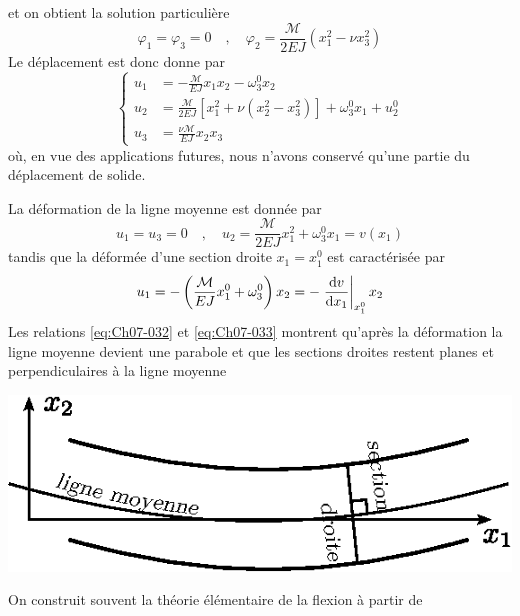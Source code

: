 et on obtient la solution particulière 
\begin{equation}
    \varphi_1 = \varphi_3 = 0 \quad , \quad \varphi_2 = \frac{\mathcal{M}}{2EJ} \left( x_1^2 - \nu x_3^2 \right)
    \label{eq:Ch07-030}
\end{equation}
Le déplacement est donc donne par
\begin{equation}
    \left\{
    \begin{aligned}
        u_1 & = -\frac{\mathcal{M}}{EJ} x_1x_2 -\omega_3^0x_2 \\
        u_2 & = \frac{\mathcal{M}}{2EJ} \left[ x_1^2 + \nu \left( x_2^2 - x_3^2 \right) \right] +\omega_3^0x_1 +u_2^0 \\
        u_3 & = \frac{\nu\mathcal{M}}{EJ} x_2x_3
    \end{aligned}
    \right.
    \label{eq:Ch07-031}
\end{equation}
où, en vue des applications futures, nous n'avons conservé qu'une partie du déplacement de solide.

La déformation de la ligne moyenne est donnée par
\begin{equation}
    u_1 = u_3 = 0 \quad , \quad u_2 = \frac{\mathcal{M}}{2EJ}x_1^2 + \omega_3^0 x_1 = v(x_1)
    \label{eq:Ch07-032}
\end{equation}
tandis que la déformée d'une section droite $x_1=x_1^0$ est caractérisée par
\begin{equation}
    u_1 = - \left( \frac{\mathcal{M}}{EJ}x_1^0 + \omega_3^0 \right) x_2 = - \left.\frac{\mathrm{d} v}{\mathrm{d} x_1}\right|_{x_1^0} x_2
    \label{eq:Ch07-033}
\end{equation}
Les relations \eqref{eq:Ch07-032} et \eqref{eq:Ch07-033} montrent qu'après la déformation la ligne moyenne devient une parabole et que les sections droites restent planes et perpendiculaires à la ligne moyenne
\begin{center}
    \includegraphics{../images/T1_Ch07-06}
\end{center}

On construit souvent la théorie élémentaire de la flexion à partir de
